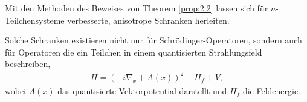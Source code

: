\begin{bem*}
\begin{bemenum}
\item Mit den Methoden des Beweises von Theorem \ref{prop:2.2} lassen sich für
$n$-Teilchensysteme verbesserte, anisotrope Schranken herleiten.
\item Solche Schranken existieren nicht nur für Schrödinger-Operatoren, sondern
auch für Operatoren die ein Teilchen in einem quantisierten Strahlungsfeld
beschreiben,
\begin{align*}
H = (-i\nabla_x  + A(x))^2 + H_f + V,
\end{align*}
wobei $A(x)$ das quantisierte Vektorpotential darstellt und $H_f$ die
Feldenergie.\maphere
\end{bemenum}
\end{bem*}
% 
% 

